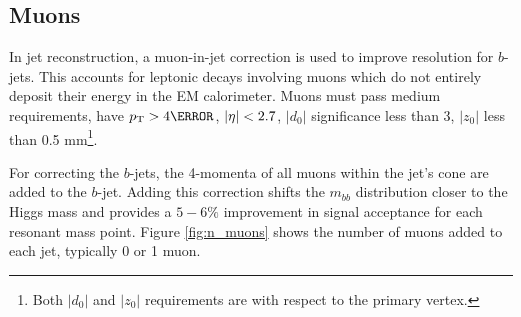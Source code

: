 \subsection{Muons}

In jet reconstruction, a muon-in-jet correction is used to improve resolution for $b$-jets. This accounts for leptonic decays involving muons which do not entirely deposit their energy in the \gls{EM} calorimeter. Muons must pass medium requirements, have $\pt > \unit{4}{\GeV}$, $|\eta| < 2.7$, $|d_{0}|$ significance less than 3, $|z_{0}|$ less than 0.5 mm\footnote{Both $|d_{0}|$ and $|z_{0}|$ requirements are with respect to the primary vertex.}.

For correcting the $b$-jets, the 4-momenta of all muons within the jet's \Dr cone are added to the $b$-jet. Adding this correction shifts the $m_{bb}$ distribution closer to the Higgs mass and provides a $5-6\%$ improvement in signal acceptance for each resonant mass point. Figure \ref{fig:n_muons} shows the number of muons added to each jet, typically 0 or 1 muon.


